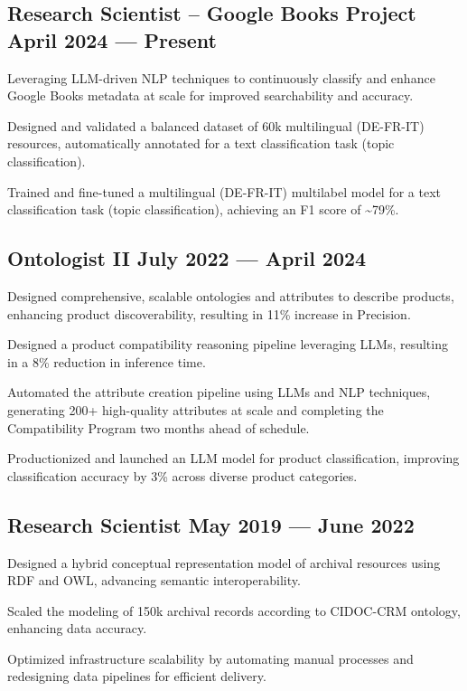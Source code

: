 \documentclass[letter,10pt]{article}
\begin{document}
\subsection{Research Scientist – Google Books Project \hfill April 2024 — Present}
\begin{zitemize}
\item Leveraging LLM-driven NLP techniques to continuously classify and enhance Google Books metadata at scale for improved searchability and accuracy.
\item Designed and validated a balanced dataset of 60k multilingual (DE-FR-IT) resources, automatically annotated for a text classification task (topic classification).
\item Trained and fine-tuned a multilingual (DE-FR-IT) multilabel model for a text classification task (topic classification), achieving an F1 score of \textasciitilde 79\%.
\end{zitemize}

\subsection{{Ontologist II \hfill July 2022 --- April 2024}}
\begin{zitemize}
\item Designed comprehensive, scalable ontologies and attributes to describe products, enhancing product discoverability, resulting in 11\% increase in Precision.
\item Designed a product compatibility reasoning pipeline leveraging LLMs, resulting in a 8\% reduction in inference time. 
\item Automated the attribute creation pipeline using LLMs and NLP techniques, generating 200+ high-quality attributes at scale and completing the Compatibility Program two months ahead of schedule.
\item Productionized and launched an LLM model for product classification, improving classification accuracy by 3\% across diverse product categories.

\end{zitemize}

\subsection{{Research Scientist \hfill May 2019 --- June 2022}}
\begin{zitemize}
\item Designed a hybrid conceptual representation model of archival resources using RDF and OWL, advancing semantic interoperability.
\item Scaled the modeling of 150k archival records according to CIDOC-CRM ontology, enhancing data accuracy.
\item Optimized infrastructure scalability by automating manual processes and redesigning data pipelines for efficient delivery.

\end{zitemize}
\end{document}
